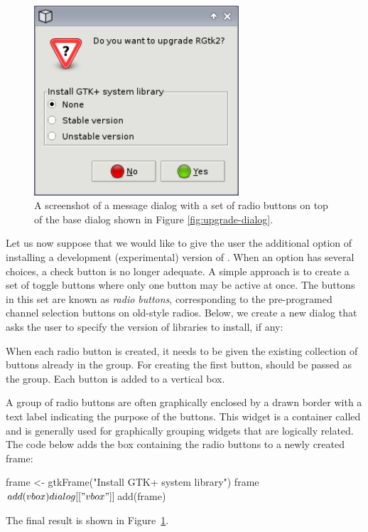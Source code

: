 \documentclass[article,shortnames]{jss}
\begin{document}
\begin{figure}[tbp]
  \begin{center}
    \includegraphics[width=3in]{radio-dialog.png}
    \caption{\label{fig:radio-dialog}A screenshot of a message dialog
with
      a set of
      radio buttons on top of the base dialog shown in Figure
      \ref{fig:upgrade-dialog}.}
  \end{center}
\end{figure}

Let us now suppose that we would like to give the user the additional
option of installing a development (experimental) version of
.  When an option has several choices, a check button is no
longer adequate. A simple approach is to create a set of toggle
buttons where only one button may be active at once. The buttons in
this set are known as \emph{radio buttons}, corresponding to the
pre-programed channel selection buttons on old-style radios.  Below,
we create a new dialog that asks the user to specify the version of
  libraries to install, if any: 
When each radio button is created, it
needs to be given the existing collection of buttons already in the
group. For creating the first button,  should be passed as
the group.  Each button is added to a vertical box.

A group of radio buttons are often graphically enclosed by a drawn
border with a text label indicating the purpose of the buttons. This
widget is a container called  and is generally used for
graphically grouping widgets that are logically related. The code
below adds the box containing the radio buttons to a newly created
frame:
\begin{Code}
frame <- gtkFrame("Install GTK+ system library")
frame$add(vbox)
dialog[["vbox"]]$add(frame)
\end{Code}
The final result is shown in Figure~\ref{fig:radio-dialog}.
\end{document}
